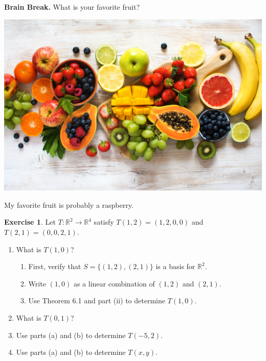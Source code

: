 \documentclass{beamer}
\newcommand{\R}{\mathbb{R}}
\newcommand{\fn}{\insertframenumber}
\theoremstyle{definition}
\newtheorem{exercise}{Exercise}
\begin{document}
\begin{frame}{\fn}
	\begin{block}{\textbf{Brain Break.}}
		What is your favorite fruit?
		\begin{center}
			\includegraphics[height=.3\textheight]{images/fruit}
		\end{center}
	
		My favorite fruit is probably a raspberry.
	\end{block}
\end{frame}
\begin{frame}{\fn}
	\begin{exercise}
		Let $T:\R^2\to \R^4$ satisfy $T(1,2)=(1,2,0,0)$ and $T(2,1)=(0,0,2,1)$. 
		\begin{enumerate}[label=(\alph*)]
			\item  What is $T(1,0)$?
		\begin{enumerate}[label=\roman*.]
			\item First, verify that $S=\{(1,2),(2,1)\}$ is a basis for $\R^2$.
			\item Write $(1,0)$ as a linear combination of $(1,2)$ and $(2,1)$.
			\item Use Theorem 6.1 and part (ii) to determine $T(1,0)$.
		\end{enumerate}
			\item What is $T(0,1)$?
			\item Use parts (a) and (b) to determine $T(-5,2)$.
			\item Use parts (a) and (b) to determine $T(x,y)$.
		\end{enumerate}
	\end{exercise}
\end{frame}
\end{document}
